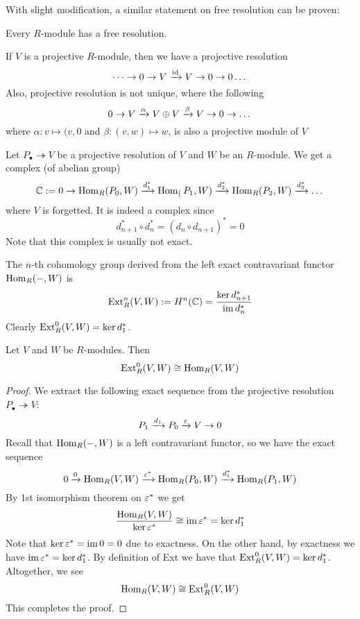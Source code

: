 With slight modification, a similar statement on free resolution can be proven:

\medskip

\begin{pro}
    Every $R$-module has a free resolution.
\end{pro}

\medskip

\begin{re}
    If $V$ is a projective $R$-module, then we have a projective resolution
    \[\dots \to 0 \to V \xrightarrow{\operatorname{id}} V \to 0 \to 0 \dots\]
    Also, projective resolution is not unique, where the following
    \[0 \to V \xrightarrow{\alpha} V\oplus V \xrightarrow{\beta} V \to 0 \to \dots\]
    where $\alpha:v\mapsto (v,0$ and $\beta:(v,w)\mapsto w$, is also a projective module of $V$
\end{re}

\medskip

\begin{defn}
    Let $P_\bullet \twoheadrightarrow V$ be a projective resolution of $V$ and $W$ be an $R$-module. We get a complex (of abelian group)
    \[{\mathbb C}:=0 \to \operatorname{Hom}_R(P_0, W)\xrightarrow{d_1^*} \operatorname{Hom}_(P_1, W) \xrightarrow{d_2^*} \operatorname{Hom}_R(P_2, W)\xrightarrow{d^*_3}\dots\]
    where $V$ is forgetted. It is indeed a complex since
    \[d_{n+1}^*\circ d_n^* = (d_n \circ d_{n+1})^* = 0\]
    Note that this complex is usually not exact.

    The $n$-th cohomology group derived from the left exact contravariant functor $\operatorname{Hom}_R(-, W)$ is 
    \[\operatorname{Ext}_R^n(V,W):= H^n({\mathbb C})=\frac{\ker d_{n+1}^*}{\operatorname{im} d_n^*}\]
    Clearly $\operatorname{Ext}_R^0(V,W) = \ker d_1 ^*$.
\end{defn}

\medskip

\begin{pro}
    Let $V$ and $W$ be $R$-modules. Then
    \[\operatorname{Ext}^0_R(V,W) \cong \operatorname{Hom}_R(V,W)\]
\end{pro}
\begin{proof}
    We extract the following exact sequence from the projective resolution $P_\bullet \twoheadrightarrow V$:
    \[P_1 \xrightarrow{d_1} P_0 \xrightarrow{\varepsilon} V \to 0\]
    Recall that $\operatorname{Hom}_R(-,W)$ is a left contravariant functor, so we have the exact sequence
    \[0 \xrightarrow{0} \operatorname{Hom}_R(V,W) \xrightarrow{\varepsilon^*} \operatorname{Hom}_R(P_0, W) \xrightarrow{d_1^*} \operatorname{Hom}_R(P_1,W)\]
    By 1st isomorphism theorem on $\varepsilon^*$ we get 
    \[\frac{\operatorname{Hom}_R(V,W)}{\ker \varepsilon^*}\cong \operatorname{im}\varepsilon^* = \ker d_1^*\]
    Note that $\ker \varepsilon^* = \operatorname{im} 0 = 0$ due to exactness. On the other hand, by exactness we have $\operatorname{im} \varepsilon^* = \ker d_1^*$. By definition of Ext we have that $\operatorname{Ext}^0_R(V,W) = \ker d_1^*$. Altogether, we see
    \[\operatorname{Hom}_R(V,W) \cong \operatorname{Ext}_R^0(V,W)\]
    This completes the proof.
\end{proof}